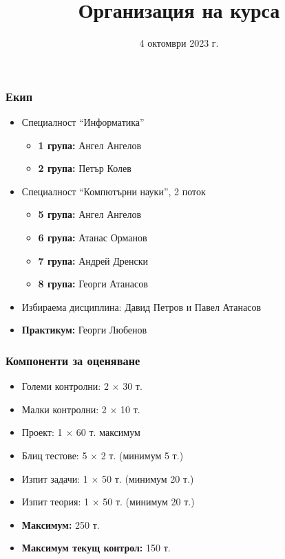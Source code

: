 \documentclass[alsotrans]{beamerswitch}
\title{Организация на курса}
\date{4 октомври 2023 г.}
\begin{document}
\begin{frame}
  \titlepage
\end{frame}

\begin{frame}
  \frametitle{Екип}

  \begin{itemize}
  \item Специалност ``Информатика''
    \begin{itemize}
    \item \textbf{1 група:} Ангел Ангелов
    \item \textbf{2 група:} Петър Колев
    \end{itemize}
  \item Специалност ``Компютърни науки'', 2 поток
    \begin{itemize}
    \item \textbf{5 група:} Ангел Ангелов
    \item \textbf{6 група:} Атанас Орманов
    \item \textbf{7 група:} Андрей Дренски
    \item \textbf{8 група:} Георги Атанасов
    \end{itemize}
  \item Избираема дисциплина: Давид Петров и Павел Атанасов
  \item \textbf{Практикум:} Георги Любенов
\end{itemize}
\end{frame}

\begin{frame}
  \frametitle{Компоненти за оценяване}

  \begin{itemize}
  \item Големи контролни: 2 $\times$ 30 т.
  \item Малки контролни: 2 $\times$ 10 т.
  \item Проект: 1 $\times$ 60 т. максимум
  \item Блиц тестове: 5 $\times$ 2 т. \alert{(минимум 5 т.)}
  \item Изпит задачи: 1 $\times$ 50 т. \alert{(минимум 20 т.)}
  \item Изпит теория: 1 $\times$ 50 т. \alert{(минимум 20 т.)}
  \item \textbf{Максимум:} 250 т.
  \item \textbf{Максимум текущ контрол:} 150 т.
  \end{itemize}
\end{frame}
\end{document}
